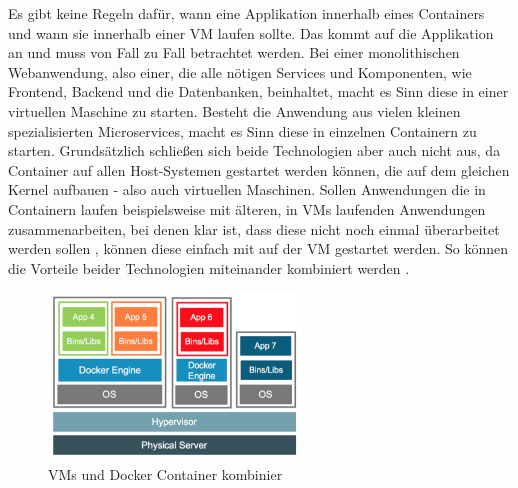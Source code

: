 \noindent Es gibt keine Regeln dafür, wann eine Applikation innerhalb eines Containers und wann sie innerhalb einer VM laufen sollte. Das kommt auf die Applikation an und muss von Fall zu Fall betrachtet werden. Bei einer monolithischen Webanwendung, also einer, die alle nötigen Services und Komponenten, wie Frontend, Backend und die Datenbanken, beinhaltet, macht es Sinn diese in einer virtuellen Maschine zu starten. Besteht die Anwendung aus vielen kleinen spezialisierten Microservices, macht es Sinn diese in einzelnen Containern zu starten. Grundsätzlich schließen sich beide Technologien aber auch nicht aus, da Container auf allen Host-Systemen gestartet werden können, die auf dem gleichen Kernel aufbauen - also auch virtuellen Maschinen. Sollen Anwendungen die in Containern laufen beispielsweise mit älteren, in VMs laufenden Anwendungen zusammenarbeiten, bei denen klar ist, dass diese nicht noch einmal überarbeitet werden sollen , können diese einfach mit auf der VM gestartet werden. So können die Vorteile beider Technologien miteinander kombiniert werden \cite{docker:cavm}.\\

\begin{figure}[!ht]
  \centering
  \includegraphics[width=0.6\textwidth]{images/container-vm-combined.jpg}
  \caption{VMs und Docker Container kombinier \cite{docker:cavm}}
\end{figure}
